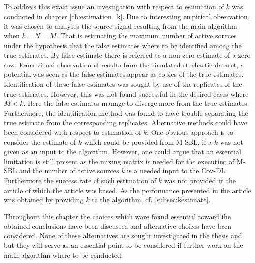 To address this exact issue an investigation with respect to estimation of $k$ was conducted in chapter \ref{ch:estimation_k}. 
Due to interesting empirical observation, it was chosen to analyses the source signal resulting from the main algorithm when $k = N = \widetilde{M}$. 
That is estimating the maximum number of active sources under the hypothesis that the false estimates where to be identified among the true estimates. By false estimate there is referred to a non-zero estimate of a zero row. 
From visual observation of results from the simulated stochastic dataset, a potential was seen as the false estimates appear as copies of the true estimates. 
Identification of these false estimates was sought by use of the replicates of the true estimates.
However, this was not found successful in the desired cases where $M < k$. 
Here the false estimates manage to diverge more from the true estimates. 
Furthermore, the identification method was found to have trouble separating the true estimate from the corresponding replicates.
Alternative methods could have been considered with respect to estimation of $k$. 
One obvious approach is to consider the estimate of $k$ which could be provided from M-SBL, if a $k$ was not given as an input to the algorithm. 
However, one could argue that an essential limitation is still present as the mixing matrix is needed for the executing of M-SBL and the number of active sources $k$ is a needed input to the Cov-DL. Furthermore the success rate of such estimation of $k$ was not provided in the article \cite{Balkan2014} of which the article was based. As the performance presented in the article was obtained by providing $k$ to the algorithm, cf. \ref{subsec:kestimate}.   

Throughout this chapter the choices which ware found essential toward the obtained conclusions have been discussed and alternative choices have been considered. 
None of these alternatives are sought investigated in the thesis and but they will serve as an essential point to be considered if further work on the main algorithm where to be conducted. 